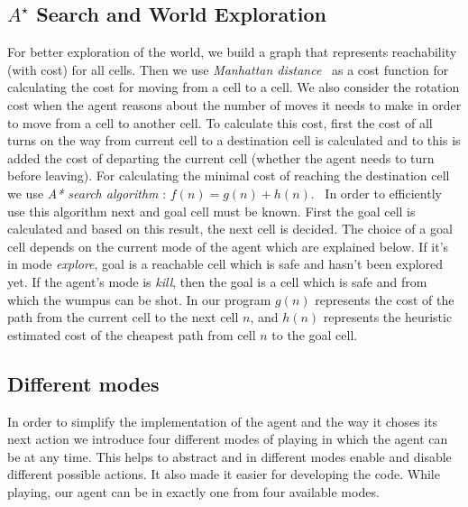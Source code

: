 \documentclass{llncs}
\begin{document}

\subsection{$A^{\star}$ Search and World Exploration}

For better exploration of the world, we build a graph that represents reachability (with cost) for all cells. Then we use \emph{Manhattan distance}~\cite{Manhattan} as a cost function for calculating the cost for moving from a cell to a cell. We also consider the rotation cost  when the agent reasons about the number of moves it needs to make in order to move from a cell to another cell. To calculate this cost, first the cost of all turns on the way from current cell to a destination cell is calculated and to this is added the cost of departing the current cell (whether the agent needs to turn before leaving). For calculating the minimal cost of reaching the destination cell we use \textit{A* search algorithm} : \(f(n) = g(n) + h(n)\). \
In order to efficiently use this algorithm next and goal cell must be known. 
First the goal cell is calculated and based on this result, the next cell is decided.  The choice of a goal cell depends on the current mode of the agent which are explained below. If it's in mode \textit{explore}, goal is a reachable cell which is safe and hasn't been explored yet. If the agent's mode is \textit{kill}, then the goal is a cell which is safe and from which the wumpus can be shot.   
In our program \(g(n)\) represents the cost of the path from the current cell to the next cell \(n\), and \(h(n)\) represents the heuristic estimated cost of the cheapest path from cell \(n\) to the goal cell. 


\subsection{Different modes}
In order to simplify the implementation of the agent and the way it choses its next action we introduce four different modes of playing in which the agent can be at any time. This helps to abstract and in different modes enable and disable different possible actions. It also made it easier for developing the code. 
While playing, our agent can be in exactly one from four available modes. 
\end{document}
